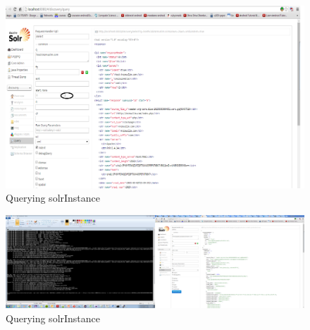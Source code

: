 \documentclass[12pt]{Report}
\begin{document}
    \newpage
\begin{figure}[ht]    
    \begin{center}
        \includegraphics[scale=0.60]{noofrows.png}
        \caption{Querying solrInstance }
        \label{Querying SOLR}
    \end{center}
\end{figure}
\newpage
  
 
 
   \newpage
\begin{figure}[ht]    
    \begin{center}
        \includegraphics[scale=0.60]{solrchangeinhost.png}
        \caption{Querying solrInstance }
        \label{Querying SOLR}
    \end{center}
\end{figure}
\newpage


  
 
 
\end{document}
